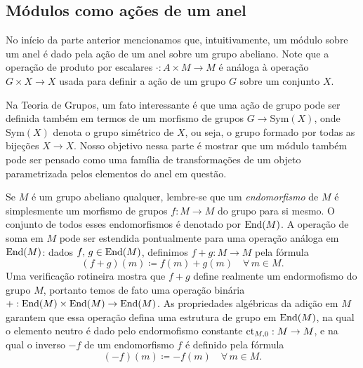 \subsection{Módulos como ações de um anel}

No início da parte anterior mencionamos que, intuitivamente, um módulo sobre um anel é dado pela ação de um anel sobre  um grupo abeliano.
Note que a operação de produto por escalares $\cdot : A \times M \to M$ é análoga à operação $G \times X \to X$ usada para definir a ação de um grupo $G$ sobre um conjunto $X$.

Na Teoria de Grupos, um fato interessante é que uma ação de grupo pode ser definida também em termos de um morfismo de grupos $G \to \mathrm{Sym}(X)$, onde $\mathrm{Sym}(X)$ denota o grupo simétrico de $X$, ou seja, o grupo formado por todas as bijeções $X \to X$.
Nosso objetivo nessa parte é mostrar que um módulo também pode ser pensado como uma família de transformações de um objeto parametrizada pelos elementos do anel em questão.

Se $M$ é um grupo abeliano qualquer, lembre-se que um \emph{endomorfismo} de $M$ é simplesmente um morfismo de grupos $f: M \to M$ do grupo para si mesmo.
O conjunto de todos esses endomorfismos é denotado por $\mathrm{End}(M)$.
A operação de soma em $M$ pode ser estendida pontualmente para uma operação análoga em $\mathrm{End}(M)$: dados $f,\, g \in \mathrm{End}(M)$, definimos $f+g: M \to M$ pela fórmula
\begin{displaymath}
  (f+g)(m) \coloneqq f(m) + g(m) \quad \forall\, m \in M.
\end{displaymath}
Uma verificação rotineira mostra que $f+g$ define realmente um endormofismo do grupo $M$, portanto temos de fato uma operação binária $+: \mathrm{End}(M) \times \mathrm{End}(M) \to \mathrm{End}(M)$.
As propriedades algébricas da adição em $M$ garantem que essa operação defina uma estrutura de grupo em $\mathrm{End}(M)$, na qual o elemento neutro é dado pelo endormofismo constante $\mathrm{ct}_{M,0}: M \to M$, e na qual o inverso $-f$ de um endomorfismo $f$ é definido pela fórmula
\begin{displaymath}
  (-f)(m) \coloneqq -f(m) \quad \forall\, m \in M.
\end{displaymath}

